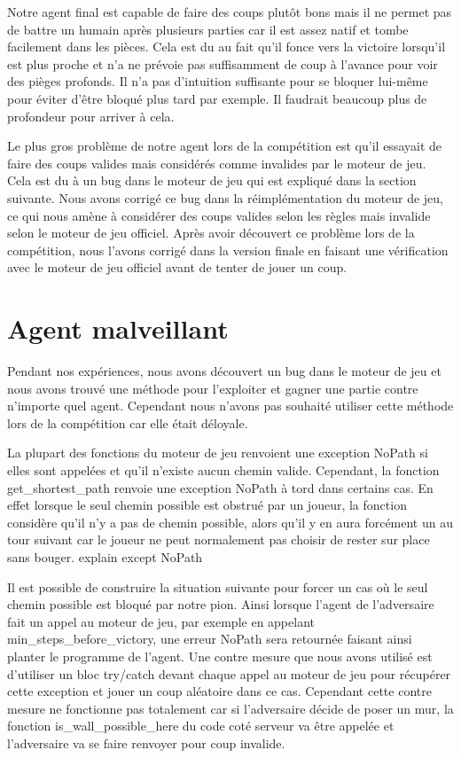 \documentclass[12pt]{article}
\begin{document}
Notre agent final est capable de faire des coups plutôt bons mais il ne permet pas de battre un humain après plusieurs parties car il est assez natif et tombe facilement dans les pièces. Cela est du au fait qu'il fonce vers la victoire lorsqu'il est plus proche et n'a ne prévoie pas suffisamment de coup à l'avance pour voir des pièges profonds. Il n'a pas d'intuition suffisante pour se bloquer lui-même pour éviter d'être bloqué plus tard par exemple. Il faudrait beaucoup plus de profondeur pour arriver à cela. 

Le plus gros problème de notre agent lors de la compétition est qu'il essayait de faire des coups valides mais considérés comme invalides par le moteur de jeu. Cela est du à un bug dans le moteur de jeu qui est expliqué dans la section suivante. Nous avons corrigé ce bug dans la réimplémentation du moteur de jeu, ce qui nous amène à considérer des coups valides selon les règles mais invalide selon le moteur de jeu officiel. Après avoir découvert ce problème lors de la compétition, nous l'avons corrigé dans la version finale en faisant une vérification avec le moteur de jeu officiel avant de tenter de jouer un coup. 

\section*{Agent malveillant}

Pendant nos expériences, nous avons découvert un bug dans le moteur de jeu et nous avons trouvé une méthode pour l'exploiter et gagner une partie contre n'importe quel agent. Cependant nous n'avons pas souhaité utiliser cette méthode lors de la compétition car elle était déloyale. 

La plupart des fonctions du moteur de jeu renvoient une exception NoPath si elles sont appelées et qu'il n'existe aucun chemin valide. Cependant, la fonction get\_shortest\_path renvoie une exception NoPath à tord dans certains cas. En effet lorsque le seul chemin possible est obstrué par un joueur, la fonction considère qu'il n'y a pas de chemin possible, alors qu'il y en aura forcément un au tour suivant car le joueur ne peut normalement pas choisir de rester sur place sans bouger.
explain except NoPath


Il est possible de construire la situation suivante pour forcer un cas où le seul chemin possible est bloqué par notre pion. Ainsi lorsque l'agent de l'adversaire fait un appel au moteur de jeu, par exemple en appelant min\_steps\_before\_victory, une erreur NoPath sera retournée faisant ainsi planter le programme de l'agent. Une contre mesure que nous avons utilisé est d'utiliser un bloc try/catch devant chaque appel au moteur de jeu pour récupérer cette exception et jouer un coup aléatoire dans ce cas. Cependant cette contre mesure ne fonctionne pas totalement car si l'adversaire décide de poser un mur, la fonction is\_wall\_possible\_here du code coté serveur va être appelée et l'adversaire va se faire renvoyer pour coup invalide. 
\end{document}
